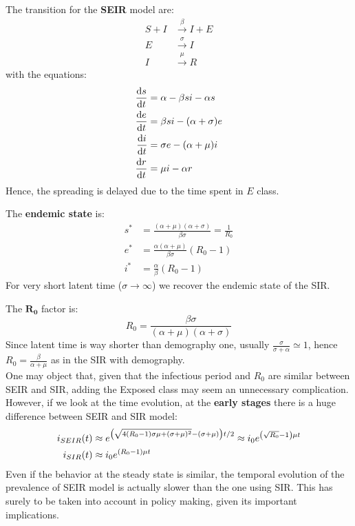 \documentclass[../main/main.tex]{subfiles}
\begin{document}
The transition for the \textbf{SEIR} model are:
\begin{equation}
\begin{split}
 S + I &\overset{\beta }{\rightarrow } I + E   \\
 E & \overset{\sigma }{\rightarrow } I  \\
 I & \overset{\mu }{\rightarrow } R
\end{split}
\end{equation}
with the equations:
\begin{equation}
  \begin{split}
    \dv{s}{t} &= \alpha -\beta s i - \alpha s \\
  \dv{e}{t} &= \beta s i - (\alpha + \sigma )e \\
  \dv{i}{t} &= \sigma e - (\alpha + \mu )i \\
  \dv{r}{t} &= \mu i - \alpha r
\end{split}
\end{equation}
Hence, the spreading is delayed due to the time spent in \( E \) class.

The \textbf{endemic state} is:
\begin{equation}
\begin{split}
s^*  &=  \frac{(\alpha +\mu )(\alpha + \sigma )}{\beta \sigma } = \frac{1}{R_0} \\
e^* &= \frac{\alpha (\alpha +\mu )}{\beta \sigma } (R_0 -1)\\
i^* &= \frac{\alpha }{\beta } (R_0 -1)
\end{split}
\end{equation}
For very short latent time (\( \sigma \rightarrow \infty  \)) we recover the endemic state of the SIR.

The \( \mathbf{R_0} \) factor is:
\begin{equation}
  R_0 = \frac{\beta \sigma }{(\alpha + \mu )(\alpha +\sigma )}
\end{equation}
Since latent time is way shorter than demography one, usually \( \frac{\sigma }{\sigma + \alpha } \simeq 1 \), hence \( R_0 = \frac{\beta }{\alpha + \mu } \) as in the SIR with demography.\\

One may object that, given that the infectious period and $R_0$ are similar between SEIR and SIR, adding the Exposed class may seem an unnecessary complication. However, if we look at the time evolution, at the \textbf{early stages} there is a huge difference between SEIR and SIR model:
\begin{equation}
\begin{split}
  i_{SEIR} (t) & \approx e^{\qty(\sqrt{4(R_0-1)\sigma \mu  + (\sigma + \mu )^2} -(\sigma +\mu ))t/2 } \approx i_0 e^{\qty(\sqrt{R_0} -1 ) \mu t} \\
    i_{SIR} (t) &\approx i_0 e^{(R_0-1) \mu t}
\end{split}
\end{equation}
Even if the behavior at the steady state is similar, the temporal evolution of the prevalence of SEIR model is actually slower than the one using SIR. This has surely to be taken into account in policy making, given its important implications.
\end{document}
